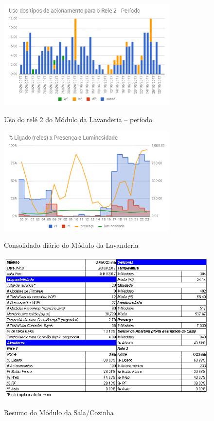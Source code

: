 \begin{figure}[H]
	\centering
	\caption{Uso do relé 2 do Módulo da Lavanderia -- período}
	\includegraphics[width=0.8\textwidth]{UsoRele2LavanderiaPeriodo}
	\label{fig:UsoRele2LavanderiaPeriodo}
\end{figure}

\begin{figure}[H]
	\centering
	\caption{Consolidado diário do Módulo da Lavanderia}
	\includegraphics[width=0.8\textwidth]{RelesPresLumiLavanderia}
	\label{fig:RelesPresLumiLavanderia}
\end{figure}

\begin{figure}[H]
	\centering
	\caption{Resumo do Módulo da Sala/Cozinha}
	\includegraphics[width=1.0\textwidth]{resumoSalaCozinha}
	\label{fig:resumoSalaCozinha}
\end{figure}

